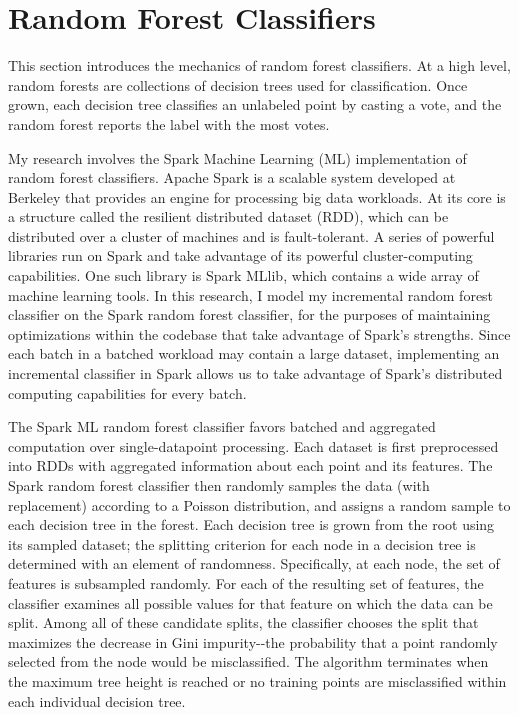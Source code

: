 \section{Random Forest Classifiers}

This section introduces the mechanics of random forest classifiers. At a high
level, random forests are collections of decision trees used for
classification. Once grown, each decision tree classifies an unlabeled point by
casting a vote, and the random forest reports the label with the most votes.
\cite{Breiman}

My research involves the Spark Machine Learning (ML) implementation of random
forest classifiers. Apache Spark is a scalable system developed at Berkeley
that provides an engine for processing big data workloads. At its core is a
structure called the resilient distributed dataset (RDD), which can be
distributed over a cluster of machines and is fault-tolerant. A series of
powerful libraries run on Spark and take advantage of its powerful
cluster-computing capabilities. One such library is Spark MLlib, which contains
a wide array of machine learning tools. In this research, I model my
incremental random forest classifier on the Spark random forest classifier, for
the purposes of maintaining optimizations within the codebase that take
advantage of Spark's strengths. Since each batch in a batched workload may
contain a large dataset, implementing an incremental classifier in Spark allows
us to take advantage of Spark's distributed computing capabilities for every
batch.

The Spark ML random forest classifier favors batched and aggregated computation
over single-datapoint processing. Each dataset is first preprocessed into RDDs
with aggregated information about each point and its features. The Spark random
forest classifier then randomly samples the data (with replacement) according
to a Poisson distribution, and assigns a random sample to each decision tree in
the forest. Each decision tree is grown from the root using its sampled
dataset; the splitting criterion for each node in a decision tree is determined
with an element of randomness. Specifically, at each node, the set of features
is subsampled randomly. For each of the resulting set of features, the
classifier examines all possible values for that feature on which the data can
be split. Among all of these candidate splits, the classifier chooses the split
that maximizes the decrease in Gini impurity-{}-the probability that a point
randomly selected from the node would be misclassified. The algorithm
terminates when the maximum tree height is reached or no training points are
misclassified within each individual decision tree.

